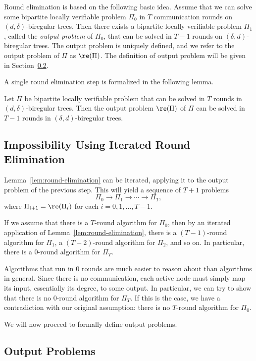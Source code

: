 Round elimination is based on the following basic idea. Assume that we can solve some bipartite locally verifiable problem $\Pi_0$ in $T$ communication rounds on $(d,\delta)$-biregular trees. Then there exists a bipartite locally verifiable problem $\Pi_1$, called the \emph{output problem} of $\Pi_0$, that can be solved in $T-1$ rounds on $(\delta,d)$-biregular trees. The output problem is uniquely defined, and we refer to the output problem of $\Pi$ as $\re(\Pi)$. The definition of output problem will be given in Section~\ref{ssec:output-problems}.

A single round elimination step is formalized in the following lemma.

\begin{lemma} \label{lem:round-elimination}
	Let $\Pi$ be bipartite locally verifiable problem that can be solved in $T$ rounds in $(d,\delta)$-biregular trees. Then the output problem $\re(\Pi)$ of $\Pi$ can be solved in $T-1$ rounds in $(\delta,d)$-biregular trees.
\end{lemma}

\subsection{Impossibility Using Iterated Round Elimination}
Lemma~\ref{lem:round-elimination} can be iterated, applying it to the output problem of the previous step. This will yield a sequence of $T+1$ problems
\[
	\Pi_0 \rightarrow \Pi_1 \rightarrow \cdots \rightarrow \Pi_{T},
\]
where $\Pi_{i+1} = \re(\Pi_i)$ for each $i = 0, 1, \dotsc, T-1$.

If we assume that there is a $T$-round algorithm for $\Pi_0$, then by an iterated application of Lemma~\ref{lem:round-elimination}, there is a $(T-1)$-round algorithm for $\Pi_1$, a $(T-2)$-round algorithm for $\Pi_2$, and so on. In particular, there is a $0$-round algorithm for $\Pi_T$.

Algorithms that run in $0$ rounds are much easier to reason about than algorithms in general. Since there is no communication, each active node must simply map its input, essentially its degree, to some output. In particular, we can try to show that there is no 0-round algorithm for $\Pi_T$. If this is the case, we have a contradiction with our original assumption: there is no $T$-round algorithm for $\Pi_0$.

We will now proceed to formally define output problems.

\subsection{Output Problems} \label{ssec:output-problems}

